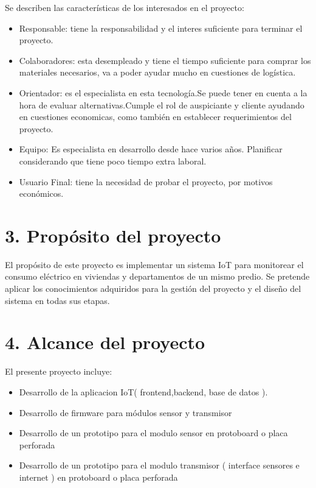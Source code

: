 \documentclass[
11pt, %
]{charter}
\begin{document}
Se describen las características de los interesados en el proyecto:

\begin{itemize}
	\item Responsable: tiene la responsabilidad y el interes suficiente para terminar el proyecto.
	\item Colaboradores: esta desempleado y tiene el tiempo suficiente para comprar los materiales necesarios, va a poder ayudar mucho en cuestiones de logística.
	\item Orientador: es el especialista en esta tecnología.Se puede tener en cuenta  a la hora de evaluar alternativas.Cumple el rol de auspiciante y cliente ayudando en cuestiones economicas, como también en establecer requerimientos del proyecto.
	\item Equipo: Es especialista en desarrollo desde hace varios años. Planificar considerando que tiene poco tiempo extra laboral.
	\item Usuario Final: tiene la necesidad de probar el proyecto, por motivos económicos.
\end{itemize}




\section{3. Propósito del proyecto}
\label{sec:proposito}


El propósito de este proyecto es implementar un sistema IoT para monitorear el consumo eléctrico en viviendas y departamentos de un mismo predio.
Se pretende aplicar los conocimientos adquiridos para la gestión del proyecto y el diseño del sistema en todas sus etapas.


\section{4. Alcance del proyecto}
\label{sec:alcance}


El presente proyecto incluye:

\begin{itemize}
\item{Desarrollo de la aplicacion IoT( frontend,backend, base de datos ).}
\item{Desarrollo de firmware para módulos sensor y transmisor }
\item{Desarrollo de un prototipo  para el modulo sensor en protoboard o placa perforada}
\item{Desarrollo de un prototipo para el modulo transmisor ( interface sensores e internet ) en protoboard o placa perforada}
\end{itemize}
\end{document}
